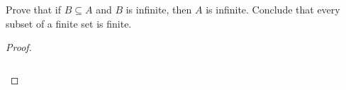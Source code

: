 Prove that if $B\subseteq A$ and $B$ is infinite, then $A$ is infinite. 
Conclude that every subset of a finite set is finite.

    \begin{proof}\renewcommand{\qedsymbol}{}\ \\\\
        \begin{align*}
        \end{align*}
    \end{proof}